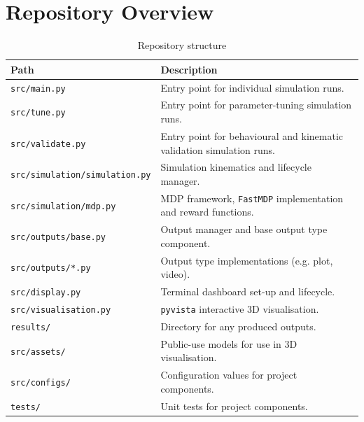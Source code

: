 \label{sec:3}

\section{Repository Overview}
\label{sec:3.1}

\begin{table}[htb]
\centering
\renewcommand{\arraystretch}{1.2}
\begin{tabular}{l@{\hspace{1cm}}p{}}
\textbf{Path} & \textbf{Description} \\
\midrule
\texttt{src/main.py} & Entry point for individual simulation runs. \\
\texttt{src/tune.py} & Entry point for parameter-tuning simulation runs. \\
\texttt{src/validate.py} & Entry point for behavioural and kinematic validation simulation runs. \\
\midrule
\texttt{src/simulation/simulation.py} & Simulation kinematics and lifecycle manager. \\
\texttt{src/simulation/mdp.py} & MDP framework, \texttt{FastMDP} implementation and reward functions. \\
\midrule
\texttt{src/outputs/base.py} & Output manager and base output type component. \\
\texttt{src/outputs/*.py} & Output type implementations (e.g. plot, video). \\
\texttt{src/display.py} & Terminal dashboard set-up and lifecycle. \\
\texttt{src/visualisation.py} & \texttt{pyvista} interactive 3D visualisation. \\
\texttt{results/} & Directory for any produced outputs. \\
\midrule
\texttt{src/assets/} & Public-use models for use in 3D visualisation. \\
\texttt{src/configs/} & Configuration values for project components. \\
\texttt{tests/} & Unit tests for project components. \\
\end{tabular}
\caption{Repository structure}
\label{tab:repo}
\end{table}

